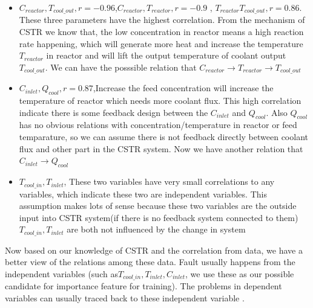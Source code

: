 \documentclass[fleqn,11pt]{wlscirep}
\begin{document}
\begin{itemize}
     \item {$C_{reactor} ,T_{cool\_out}, r=-0.96$,$C_{reactor} ,T_{reactor},r=-0.9$ ,  $T_{reactor} T_{cool\_out},r=0.86$. These three parameters have the highest correlation. From the mechanism of CSTR we know that, the low concentration in reactor means a high reaction rate happening, which will generate more heat and increase the temperature$T_{reactor}$ in reactor and will lift the output temperature of coolant output$T_{cool\_out}$. We can have the posssible relation that  $C_{reactor} \rightarrow T_{reactor} \rightarrow T_{cool\_out} $ } 
      \item {$C_{inlet} ,Q_{cool}, r=0.87$,Increase the feed concentration will increase the temperature of reactor which needs more coolant flux. This high correlation indicate there is some feedback design between the $C_{inlet}$  and $ Q_{cool}$. Also $Q_{cool}$ has  no obvious relations with concentration/temperature in reactor or feed temparature, so we can assume there is not feedback directly between coolant flux and other part in the CSTR system. Now we have another relation that
      $C_{inlet} \rightarrow Q_{cool}$ } 
        \item {$T_{cool\_in} ,T_{inlet}$, These two variables have very small correlations to any variables, which indicate these two are independent variables. This assumption makes lots of sense because these two variables are the outside input into CSTR system(if there is no feedback system connected to them) $T_{cool\_in} ,T_{inlet}$ are both not influenced by the change in system } 
\end{itemize}
Now based on our knowledge of CSTR and the correlation from data, we have a better view of the relations among these data. Fault usually happens from the independent variables (such as$T_{cool\_in} ,T_{inlet}, C_{inlet}$, we use these as our possible candidate for importance feature for training). The problems in dependent variables can usually traced back to these independent variable . 
\end{document}
